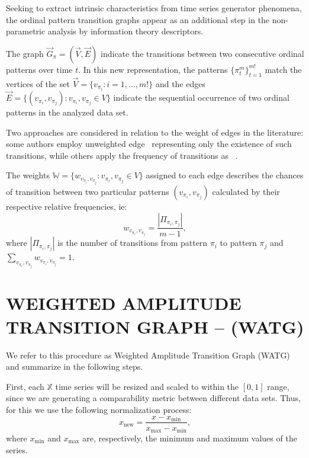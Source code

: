 \documentclass{isprs}
\begin{document}
	Seeking to extract intrinsic characteristics from time series generator phenomena, the ordinal pattern transition graphs appear as an additional step in the non-parametric analysis by information theory descriptors.
	
	The graph $\vec{G}_{\pi} = (\vec{V}, \vec{E})$ indicate the transitions between two consecutive ordinal patterns over time $t$.
	In this new representation, the patterns $\{\pi_t^m \}_{t = 1}^{m!}$ match the vertices of the set $\vec{V} = \{v_{\pi_i}: i = 1, \dots, m! \}$ and the edges $\vec{E} = \{(v_{\pi_i}, v_{\pi_j}): v_{\pi_i}, v_{\pi_j} \in V \}$ indicate the sequential occurrence of two ordinal patterns in the analyzed data set.
	
	Two approaches are considered in relation to the weight of edges in the literature: some authors employ unweighted edge~\citep{McCullough2015lagged, Kulp2016ordinal} representing only the existence of such transitions, while others apply the frequency of transitions as ~\citep{Sorrentino2015periodic, Zhang2017ConstructingOP}.
	
	The weights $\mathbb{W} = \{w_{v_{\pi_i}, v_{\pi_j}}: v_{\pi_i}, v_{\pi_j} \in V \}$ assigned to each edge describes the chances of transition between two particular patterns $(v_{\pi_i}, v_{\pi_j})$ calculated by their respective relative frequencies, ie:	
	\begin{equation}
	w_{v_{\pi_i}, v_{\pi_j}} = \frac{|\Pi_{\pi_i,\pi_j}|}{m-1},
	\end{equation}
	where $|\Pi_{\pi_i,\pi_j}|$ is the number of transitions from pattern $\pi_i$ to pattern $\pi_j$ and $\sum_{v_{\pi_i}, v_{\pi_j}}w_{v_{\pi_i}, v_{\pi_j}} = 1$.
	
	\section{WEIGHTED AMPLITUDE TRANSITION GRAPH -- (WATG)}\label{WATG}
	
	We refer to this procedure as Weighted Amplitude Transition Graph (WATG) and summarize in the following steps.
	
First, each $\mathbb{X}$ time series will be resized and scaled to within the $[0, 1]$ range, since we are generating a comparability metric between different data sets.
Thus, for this we use the following normalization process:
\begin{equation}
x_{\text{new}} = \frac{x - x_{\min}}{x_{\max} - x_{\min}},
\end{equation}
where $x_{\min}$ and $x_{\max}$ are, respectively, the minimum and maximum values of the series.
	
\end{document}
